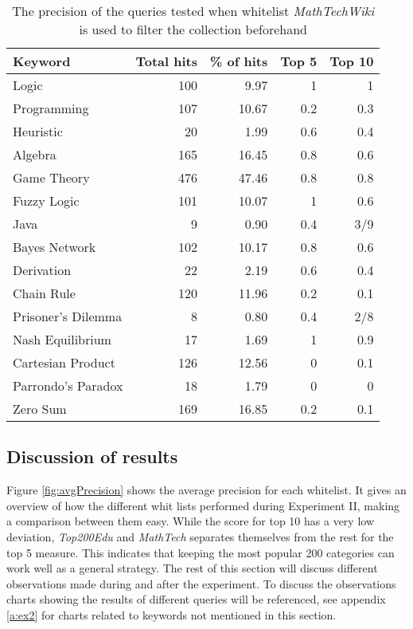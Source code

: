 \begin{table}[h]
\centering
\small
\begin{tabular} {|| p{10em} | r | r | r | r ||} 
 \hline
 Keyword & Total hits & \% of hits & Top 5 & Top 10 \\ [0.5ex] 
 \hline

Logic & 100 & 9.97 & 1 & 1 \\
Programming & 107 & 10.67 & 0.2 & 0.3 \\
Heuristic & 20 & 1.99 & 0.6 & 0.4 \\
Algebra & 165 & 16.45 & 0.8 & 0.6 \\
Game Theory & 476 & 47.46 & 0.8 & 0.8 \\
\hline
Fuzzy Logic & 101 & 10.07 & 1 & 0.6 \\
Java & 9 & 0.90 & 0.4 & 3/9 \\
Bayes Network & 102 & 10.17 & 0.8 & 0.6 \\
Derivation & 22 & 2.19 & 0.6 & 0.4 \\
\hline
Chain Rule & 120 & 11.96 & 0.2 & 0.1 \\
Prisoner's Dilemma & 8 & 0.80 & 0.4 & 2/8 \\
Nash Equilibrium & 17 & 1.69 & 1 & 0.9 \\
Cartesian Product & 126 & 12.56 & 0 & 0.1 \\
Parrondo's Paradox & 18 & 1.79 & 0 & 0 \\
Zero Sum & 169 & 16.85 & 0.2 & 0.1 \\

 \hline
\end{tabular}
\caption{The precision of the queries tested when whitelist \textit{MathTechWiki} is used to filter the collection beforehand}
\label{table:p_test_list4}
\end{table}
\clearpage



\subsection{Discussion of results}



Figure \ref{fig:avgPrecision} shows the average precision for each whitelist. It gives an overview of how the different whit lists performed during Experiment II, making a comparison between them easy. While the score for top 10 has a very low deviation, \textit{Top200Edu} and \textit{MathTech} separates themselves from the rest for the top 5 measure. This indicates that keeping the most popular 200 categories can work well as a general strategy. The rest of this section will discuss different observations made during and after the experiment. To discuss the observations charts showing the results of different queries will be referenced, see appendix \ref{a:ex2} for charts related to keywords not mentioned in this section.

